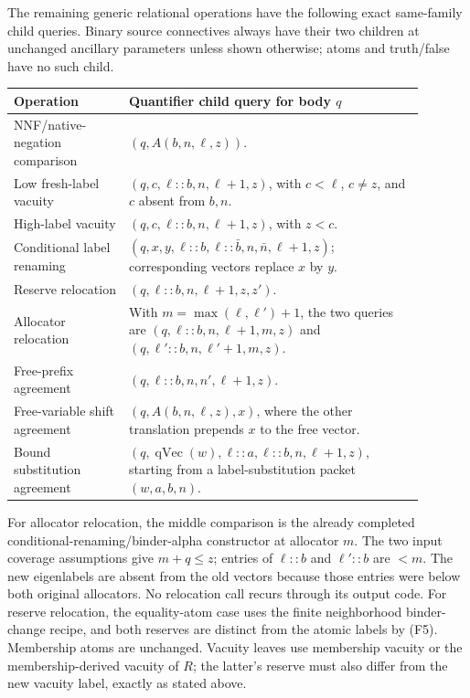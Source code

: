 The remaining generic relational operations have the following exact
same-family child queries.  Binary source connectives always have
their two children at unchanged ancillary parameters unless shown
otherwise; atoms and truth/false have no such child.
\begin{center}\small
\begin{tabular}{p{0.25\linewidth}p{0.64\linewidth}}
Operation & Quantifier child query for body $q$\\ \hline
NNF/native-negation comparison & $(q,A(b,n,\ell,z))$.\\
Low fresh-label vacuity & $(q,c,\ell::b,n,\ell+1,z)$, with $c<\ell$, $c\ne z$, and $c$ absent from $b,n$.\\
High-label vacuity & $(q,c,\ell::b,n,\ell+1,z)$, with $z<c$.\\
Conditional label renaming & $(q,x,y,\ell::b,\ell::\bar b,n,\bar n,\ell+1,z)$; corresponding vectors replace $x$ by $y$.\\
Reserve relocation & $(q,\ell::b,n,\ell+1,z,z')$.\\
Allocator relocation & With $m=\max(\ell,\ell')+1$, the two queries are $(q,\ell::b,n,\ell+1,m,z)$ and $(q,\ell'::b,n,\ell'+1,m,z)$.\\
Free-prefix agreement & $(q,\ell::b,n,n',\ell+1,z)$.\\
Free-variable shift agreement & $(q,A(b,n,\ell,z),x)$, where the other translation prepends $x$ to the free vector.\\
Bound substitution agreement & $(q,\operatorname{qVec}(w),\ell::a,\ell::b,n,\ell+1,z)$, starting from a label-substitution packet $(w,a,b,n)$.\\
\end{tabular}
\end{center}

For allocator relocation, the middle comparison is the already
completed conditional-renaming/binder-alpha constructor at allocator
$m$.  The two input coverage assumptions give $m+q\le z$; entries of
$\ell::b$ and $\ell'::b$ are $<m$.  The new eigenlabels are absent
from the old vectors because those entries were below both original
allocators.  No relocation call recurs through its output code.
For reserve relocation, the equality-atom case uses the finite
neighborhood binder-change recipe, and both reserves are distinct
from the atomic labels by (F5).  Membership atoms are unchanged.
Vacuity leaves use membership vacuity or the membership-derived
vacuity of $R$; the latter's reserve must also differ from the new
vacuity label, exactly as stated above.


